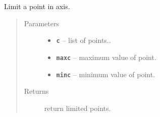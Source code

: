 \documentclass[letterpaper,10pt,english]{sphinxmanual}
\begin{document}

\begin{fulllineitems}
\label{RRtoolbox.lib:RRtoolbox.lib.image.limitaxispoints}
Limit a point in axis.
\begin{quote}\begin{description}
\item[{Parameters}] \leavevmode\begin{itemize}
\item {} 
\textbf{\texttt{c}} -- list of points..

\item {} 
\textbf{\texttt{maxc}} -- maximum value of point.

\item {} 
\textbf{\texttt{minc}} -- minimum value of point.

\end{itemize}

\item[{Returns}] \leavevmode
return limited points.

\end{description}\end{quote}

\end{fulllineitems}

\end{document}
